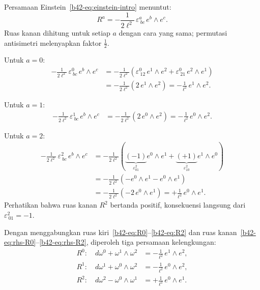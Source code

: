 Persamaan Einstein~\eqref{b42-eq:einstein-intro} menuntut:
\begin{equation}
    R^a = -\frac{1}{2\ell^2}\,\varepsilon^{a}_{\ bc}\,e^b \wedge e^c. \label{b42-eq:einstein-curvature}
\end{equation}
Ruas kanan dihitung untuk setiap $a$ dengan cara yang sama; permutasi antisimetri melenyapkan faktor $\frac{1}{2}$.

\noindent Untuk $a = 0$:
\begin{align}
    -\frac{1}{2\ell^2}\,\varepsilon^{0}_{\ bc}\,e^b \wedge e^c &= -\frac{1}{2\ell^2}\!\left(\varepsilon^{0}_{\ 12}\,e^1 \wedge e^2 + \varepsilon^{0}_{\ 21}\,e^2 \wedge e^1\right) \nonumber\\[4pt]
    &= -\frac{1}{2\ell^2}\!\left(2\,e^1 \wedge e^2\right) = -\frac{1}{\ell^2}\,e^1 \wedge e^2. \label{b42-eq:rhs-R0}
\end{align}

\noindent Untuk $a = 1$:
\begin{align}
    -\frac{1}{2\ell^2}\,\varepsilon^{1}_{\ bc}\,e^b \wedge e^c &= -\frac{1}{2\ell^2}\!\left(2\,e^0 \wedge e^2\right) = -\frac{1}{\ell^2}\,e^0 \wedge e^2. \label{b42-eq:rhs-R1}
\end{align}

\noindent Untuk $a = 2$:
\begin{align}
    -\frac{1}{2\ell^2}\,\varepsilon^{2}_{\ bc}\,e^b \wedge e^c &= -\frac{1}{2\ell^2}\!\left(\underbrace{(-1)}_{\varepsilon^2_{01}}e^0 \wedge e^1 + \underbrace{(+1)}_{\varepsilon^2_{10}}e^1 \wedge e^0\right) \nonumber\\[4pt]
    &= -\frac{1}{2\ell^2}\!\left(-e^0 \wedge e^1 - e^0 \wedge e^1\right) \nonumber\\[4pt]
    &= -\frac{1}{2\ell^2}\!\left(-2\,e^0 \wedge e^1\right) = +\frac{1}{\ell^2}\,e^0 \wedge e^1. \label{b42-eq:rhs-R2}
\end{align}
Perhatikan bahwa ruas kanan $R^2$ bertanda positif, konsekuensi langsung dari $\varepsilon^{2}_{\ 01} = -1$.

Dengan menggabungkan ruas kiri~\eqref{b42-eq:R0}--\eqref{b42-eq:R2} dan ruas kanan~\eqref{b42-eq:rhs-R0}--\eqref{b42-eq:rhs-R2}, diperoleh tiga persamaan kelengkungan:
\begin{align}
    R^0:\quad d\omega^0 + \omega^1 \wedge \omega^2 &= -\frac{1}{\ell^2}\,e^1 \wedge e^2, \label{b42-eq:R0-full}\\[6pt]
    R^1:\quad d\omega^1 + \omega^0 \wedge \omega^2 &= -\frac{1}{\ell^2}\,e^0 \wedge e^2, \label{b42-eq:R1-full}\\[6pt]
    R^2:\quad d\omega^2 - \omega^0 \wedge \omega^1 &= +\frac{1}{\ell^2}\,e^0 \wedge e^1. \label{b42-eq:R2-full}
\end{align}

